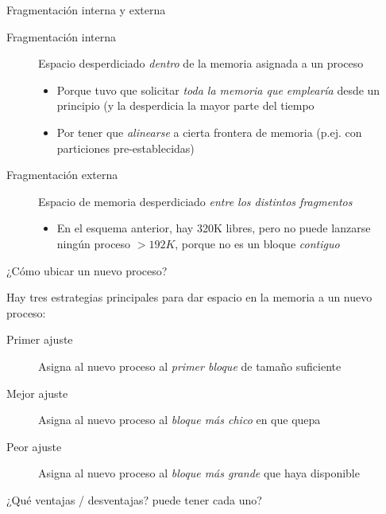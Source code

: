 \documentclass[presentation]{beamer}
\begin{document}
\begin{frame}[label={sec:org64eacbb}]{Fragmentación interna y externa}
\begin{description}
\item[{Fragmentación interna}] Espacio desperdiciado \emph{dentro} de la
memoria asignada a un proceso
\begin{itemize}
\item Porque tuvo que solicitar \emph{toda la memoria que emplearía} desde
un principio (y la desperdicia la mayor parte del tiempo
\item Por tener que \emph{alinearse} a cierta frontera de memoria (p.ej. con
particiones pre-establecidas)
\end{itemize}
\item[{Fragmentación externa}] Espacio de memoria desperdiciado \emph{entre los
distintos fragmentos}
\begin{itemize}
\item En el esquema anterior, hay 320K libres, pero no puede lanzarse
ningún proceso \(> 192K\), porque no es un bloque \emph{contiguo}
\end{itemize}
\end{description}
\end{frame}

\begin{frame}[label={sec:orga6f5741}]{¿Cómo ubicar un nuevo proceso?}
\begin{center}
Hay tres estrategias principales para dar espacio en la memoria a un
nuevo proceso:
\end{center}
\begin{description}
\item[{Primer ajuste}] Asigna al nuevo proceso al \emph{primer bloque} de
tamaño suficiente
\item[{Mejor ajuste}] Asigna al nuevo proceso al \emph{bloque más chico} en
que quepa
\item[{Peor ajuste}] Asigna al nuevo proceso al \emph{bloque más grande} que
haya disponible
\end{description}
\begin{center}
¿Qué ventajas / desventajas? puede tener cada uno?
\end{center}
\end{frame}
\end{document}
